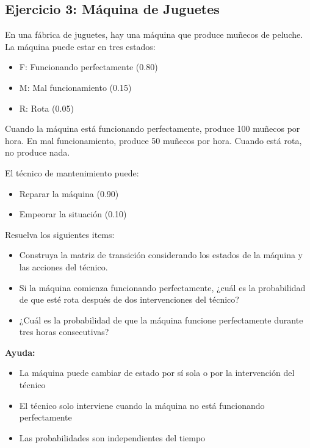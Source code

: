 \documentclass[a4paper,11pt]{article}
\begin{document}
\subsection{Ejercicio 3: Máquina de Juguetes}

En una fábrica de juguetes, hay una máquina que produce muñecos de peluche. La máquina puede estar en tres estados:

\begin{itemize}
    \item F: Funcionando perfectamente (0.80)
    \item M: Mal funcionamiento (0.15)
    \item R: Rota (0.05)
\end{itemize}

Cuando la máquina está funcionando perfectamente, produce 100 muñecos por hora. En mal funcionamiento, produce 50 muñecos por hora. Cuando está rota, no produce nada.

\vspace{0.5em}

El técnico de mantenimiento puede:
\begin{itemize}
    \item Reparar la máquina (0.90)
    \item Empeorar la situación (0.10)
\end{itemize}

Resuelva los siguientes items:

\begin{itemize}
    \item[a)] Construya la matriz de transición considerando los estados de la máquina y las acciones del técnico.
    \item[b)] Si la máquina comienza funcionando perfectamente, ¿cuál es la probabilidad de que esté rota después de dos intervenciones del técnico?
    \item[c)] ¿Cuál es la probabilidad de que la máquina funcione perfectamente durante tres horas consecutivas?
\end{itemize}

\textbf{Ayuda:}
\begin{itemize}
    \item La máquina puede cambiar de estado por sí sola o por la intervención del técnico
    \item El técnico solo interviene cuando la máquina no está funcionando perfectamente
    \item Las probabilidades son independientes del tiempo
\end{itemize}
\end{document}
